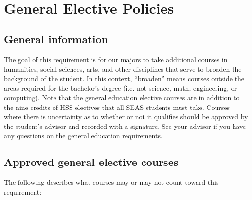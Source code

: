 \documentclass[12pt,twoside]{article}
\begin{document}
\section{General Elective Policies}

\label{geneduelectives}

\subsection{General information}

The goal of this requirement is for our majors to take additional
courses in humanities, social sciences, arts, and other disciplines
that serve to broaden the background of the student. In this context,
``broaden'' means courses outside the areas required for the
bachelor's degree (i.e. not science, math, engineering, or
computing). Note that the general education elective courses are in
addition to the nine credits of HSS electives that all SEAS students
must take.  Courses where there is uncertainty as to whether or not it
qualifies should be approved by the student's advisor and
recorded with a signature.  See your advisor if you have any questions
on the general education requirements.

\subsection{Approved general elective courses}

The following describes what courses may or may not count toward this
requirement:
\end{document}
